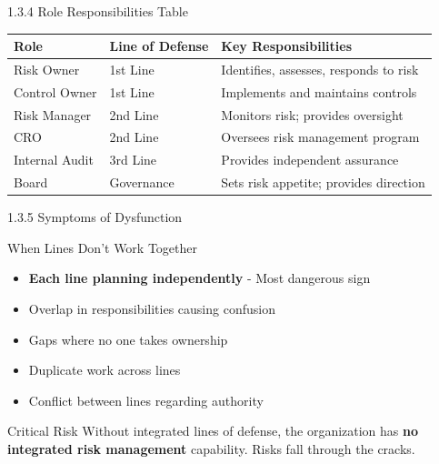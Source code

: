 \documentclass{beamer}
\begin{document}
	\begin{frame}{1.3.4 Role Responsibilities Table}
		\begin{table}
			\centering
			\begin{tabular}{|p{2.5cm}|p{3.5cm}|p{5cm}|}
				\hline
				\textbf{Role} & \textbf{Line of Defense} & \textbf{Key Responsibilities} \\
				\hline
				Risk Owner & 1st Line & Identifies, assesses, responds to risk \\
				\hline
				Control Owner & 1st Line & Implements and maintains controls \\
				\hline
				Risk Manager & 2nd Line & Monitors risk; provides oversight \\
				\hline
				CRO & 2nd Line & Oversees risk management program \\
				\hline
				Internal Audit & 3rd Line & Provides independent assurance \\
				\hline
				Board & Governance & Sets risk appetite; provides direction \\
				\hline
			\end{tabular}
		\end{table}
	\end{frame}
	
	\begin{frame}{1.3.5 Symptoms of Dysfunction}
		\begin{block}{When Lines Don't Work Together}
			\begin{itemize}
				\item \textbf{Each line planning independently} - Most dangerous sign
				\item Overlap in responsibilities causing confusion
				\item Gaps where no one takes ownership
				\item Duplicate work across lines
				\item Conflict between lines regarding authority
			\end{itemize}
		\end{block}
		\begin{alertblock}{Critical Risk}
			Without integrated lines of defense, the organization has \textbf{no integrated risk management} capability. Risks fall through the cracks.
		\end{alertblock}
	\end{frame}
	
\end{document}
